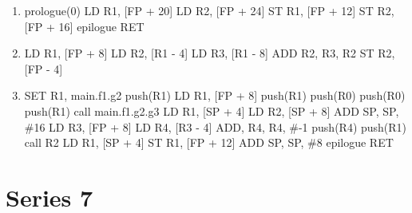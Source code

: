 \documentclass[12pt,fleqn]{article}		%
\begin{document}
\begin{enumerate}
\item
\begin{algorithmic}
\State prologue(0)
\State {}
\State LD R1, [FP + 20]
\State LD R2, [FP + 24]
\State ST R1, [FP + 12]
\State ST R2, [FP + 16]
\State epilogue
\State RET
\end{algorithmic}
\item
\begin{algorithmic}
\State {}
\State LD R1, [FP + 8]
\State LD R2, [R1 - 4]
\State LD R3, [R1 - 8]
\State ADD R2, R3, R2
\State ST R2, [FP - 4]
\end{algorithmic}
\item
\begin{algorithmic}
\State {}
\State SET R1, main.f1.g2
\State push(R1)
\State LD R1, [FP + 8]
\State push(R1)
\State push(R0)
\State push(R0) 
\State push(R1)
\State call main.f1.g2.g3
\State LD R1, [SP + 4]
\State LD R2, [SP + 8]
\State ADD SP, SP, \#16
\State LD R3, [FP + 8]
\State LD R4, [R3 - 4]
\State ADD, R4, R4, \#-1
\State push(R4)
\State push(R1)
\State call R2
\State LD R1, [SP + 4]
\State ST R1, [FP + 12]
\State ADD SP, SP, \#8
\State epilogue
\State RET
\end{algorithmic}
\end{enumerate}

\section{Series 7}
\end{document}
